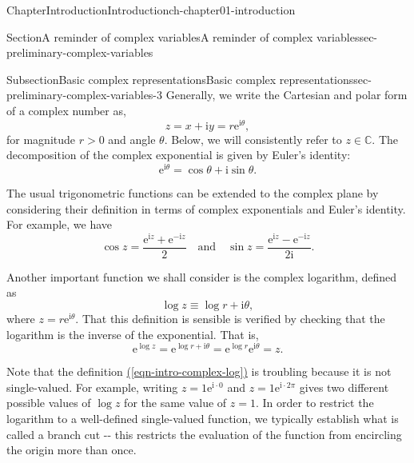 \documentclass[oneside,10pt,]{book}
\newcommand{\xreffont}{\relax}
\numberwithin{equation}{section}
\newcommand{\e}{\mathrm{e}}
\newcommand{\im}{\mathrm{i}}
\begin{document}
\begin{chapterptx}{Chapter}{Introduction}{}{Introduction}{}{}{ch-chapter01-introduction}
\begin{sectionptx}{Section}{A reminder of complex variables}{}{A reminder of complex variables}{}{}{sec-preliminary-complex-variables}
%
%
\typeout{************************************************}
\typeout{************************************************}
%
\begin{subsectionptx}{Subsection}{Basic complex representations}{}{Basic complex representations}{}{}{sec-preliminary-complex-variables-3}
Generally, we write the Cartesian and polar form of a complex number as,%
\begin{equation*}
z = x + \im y = r\e^{\im\theta},
\end{equation*}
for magnitude \(r > 0\) and angle \(\theta\). Below, we will consistently refer to \(z\in\mathbb{C}\). The decomposition of the complex exponential is given by Euler's identity:%
\begin{equation}
\e^{\im\theta} = \cos \theta + \im \sin\theta.\label{eq-complex-euler}
\end{equation}
%
\par
The usual trigonometric functions can be extended to the complex plane by considering their definition in terms of complex exponentials and Euler's identity. For example, we have%
\begin{equation}
\cos z = \frac{\e^{\im z} + \e^{-\im z}}{2} \quad \text{and} \quad \sin z = \frac{\e^{\im
z} - \e^{-\im z}}{2\im}.\label{eq-complex-cossin}
\end{equation}
%
\par
Another important function we shall consider is the complex logarithm, defined as%
\begin{equation}
\log z \equiv \log r + \im \theta,\label{eqn-intro-complex-log}
\end{equation}
where \(z = r\e^{\im\theta}\). That this definition is sensible is verified by checking that the logarithm is the inverse of the exponential. That is,%
\begin{equation*}
\e^{\log z} = \e^{\log r + \im\theta} = \e^{\log r} \e^{\im\theta} = z.
\end{equation*}
%
\par
Note that the definition \hyperref[eqn-intro-complex-log]{({\xreffont\ref{eqn-intro-complex-log}})} is troubling because it is not single-valued. For example, writing \(z = 1 \e^{\im \cdot 0}\) and \(z = 1 \e^{\im
\cdot 2\pi}\) gives two different possible values of \(\log z\) for the same value of \(z
= 1\). In order to restrict the logarithm to a well-defined single-valued function, we typically establish what is called a branch cut -{}-{} this restricts the evaluation of the function from encircling the origin more than once.%

\end{subsectionptx}
\end{sectionptx}
\end{chapterptx}
\end{document}
